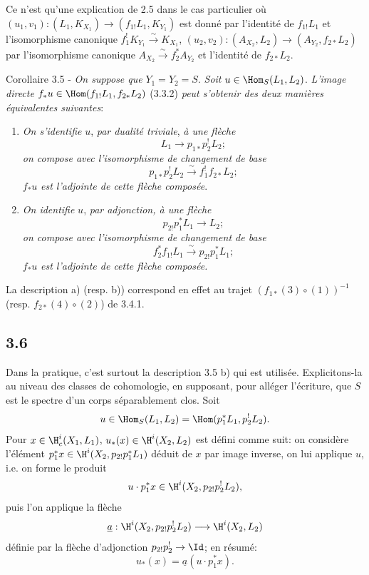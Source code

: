 Ce n'est qu'une explication de 2.5 dans le cas particulier où $(u_1,v_1):(L_1,K_{X_1})\to(f_{1!}L_1,K_{Y_1})$ est donné par l'identité de $f_{1!}L_1$ et l'isomorphisme canonique $f_1^!K_{Y_1}\xrightarrow{\sim}K_{X_1}$, $(u_2,v_2):(A_{X_2},L_2)\to(A_{Y_2},f_{2*}L_2)$ par l'isomorphisme canonique $A_{X_2}\xrightarrow{\sim}f_2^*A_{Y_2}$ et l'identité de $f_{2*}L_2$.

\begin{statement}{Corollaire 3.5 -}
\emph{On suppose que} $Y_1=Y_2=S$. \emph{Soit} $u\in\Hom_S(L_1,L_2)$. \emph{L'image directe} $f_*u\in\Hom(f_{1!}L_1,f_{2*}L_2)$ (3.3.2) \emph{peut s'obtenir des deux manières équivalentes suivantes}:
\end{statement}
\begin{enumerate}[label=\alph*)]
\item \emph{On s'}\emph{identifie} $u$, \emph{par dualité triviale}, \emph{à une flèche}
\[
L_1\longrightarrow p_{1*}p_2^!L_2;
\]
\emph{on compose avec l'isomorphisme de changement de base}
\[
p_{1*}p_2^!L_2\xrightarrow{\sim}f_1^!f_{2*}L_2;
\]
$f_*u$ \emph{est l'adjointe de cette flèche composée}.
\item \emph{On identifie} $u$, \emph{par adjonction, à une flèche}
\[
p_{2!}p_1^*L_1\longrightarrow L_2;
\]
\emph{on compose avec l'isomorphisme de changement de base}
\[
f_2^*f_{1!}L_1\xrightarrow{\sim}p_{2!}p_1^*L_1;
\]
$f_*u$ \emph{est l'adjointe de cette flèche composée.}
\end{enumerate}
La description a) (resp. b)) correspond en effet au trajet $(f_{1*}(3)\circ(1))^{-1}$ (resp. $f_{2*}(4)\circ(2)$) de 3.4.1.

\subsection*{3.6}
Dans la pratique, c'est surtout la description 3.5 b) qui est utilisée. Explicitons-la au niveau des classes de cohomologie, en supposant, pour alléger l'écriture, que $S$ est le spectre d'un corps séparablement clos. Soit
\[
u\in\Hom_S(L_1,L_2)=\Hom(p_1^*L_1,p_2^!L_2).
\]
Pour $x\in\H_c^i(X_1,L_1)$, $u_*(x)\in\H^i(X_2,L_2)$ est défini comme suit: on considère l'élément $p_1^*x\in\H^i(X_2,p_{2!}p_1^*L_1)$ déduit de $x$ par image inverse, on lui applique $u$, i.e. on forme le produit
\[
u\cdot p_1^*x\in \H^i(X_2,p_{2!}p_2^!L_2),
\]
puis l'on applique la flèche
\[
\underline{a}:\H^i(X_2,p_{2!}p_2^!L_2)\longrightarrow \H^i(X_2,L_2)
\]
définie par la flèche d'adjonction $p_{2!}p_2^!\to\Id$; en résumé:
\begin{equation}
u_*(x)=\underline{a}(u\cdot p_1^*x).
\tag{3.6.1}
\end{equation}

